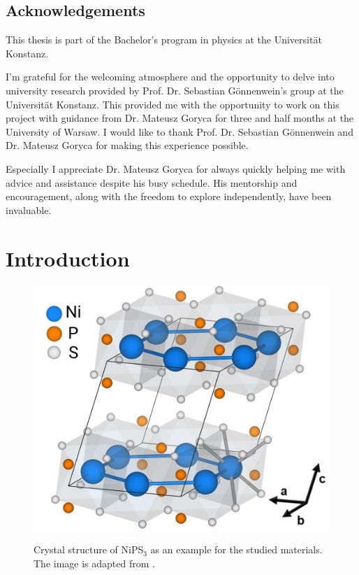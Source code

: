 \documentclass[
	twoside,
	parskip=half,
	a4paper,
]{scrbook}
\begin{document}
\clearpage
\section*{Acknowledgements}
This thesis is part of the Bachelor's program in physics at the Universität Konstanz.

I'm grateful for the welcoming atmosphere and the opportunity to delve into university research provided by Prof. Dr. Sebastian Gönnenwein's group at the Universität Konstanz. 
This provided me with the opportunity to work on this project with guidance from Dr. Mateusz Goryca for three and half months at the University of Warsaw.
I would like to thank Prof. Dr. Sebastian Gönnenwein and Dr. Mateusz Goryca for making this experience possible.

Especially I appreciate Dr. Mateusz Goryca for always quickly helping me with advice and assistance despite his busy schedule.
His mentorship and encouragement, along with the freedom to explore independently, have been invaluable.


\cleardoublepage
{
	\sffamily
	\hypersetup{hidelinks}
	\tableofcontents
}

\mainmatter

\chapter{Introduction}
\begin{figure}
	\includegraphics[width=.4\textwidth]{../../figures/crystal structures/NiPS3 3d.png}\\
	\caption{}
	Crystal structure of NiPS$_3$ as an example for the studied materials.
	The image is adapted from \cite{NiPS3_coherent}.
	\label{fig:crystal structure}
\end{figure}
\end{document}

